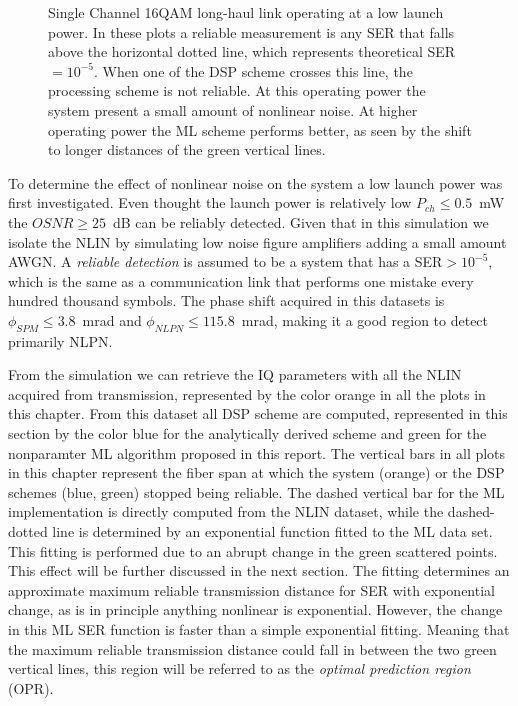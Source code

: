 \begin{figure}[h]
  \centering
  \qquad
     \qquad
    \caption{Single Channel 16QAM long-haul link operating at a low launch power. In these plots a reliable measurement is any SER that falls above the horizontal dotted line, which represents theoretical SER$=10^{-5}$. When one of the DSP scheme crosses this line, the processing scheme is not reliable. At this operating power the system present a small amount of nonlinear noise. At higher operating power the ML scheme performs better, as seen by the shift to longer distances of the green vertical lines.  }
    \label{fig:lowP}
\end{figure}
 
To determine the effect of nonlinear noise on the system a low launch power was first investigated. Even thought the launch power is relatively low $P_{ch}\le 0.5$~mW the $OSNR\ge 25$~dB can be reliably detected. Given that in this simulation we isolate the NLIN by simulating low noise figure amplifiers adding a small amount AWGN. A \textit{reliable detection} is assumed to be a system that has a SER$>10^{-5}$, which is the same as a communication link that performs one mistake every hundred thousand symbols. The phase shift acquired in this datasets is $\phi_{SPM}\le 3.8$~mrad and $\phi_{NLPN}\le 115.8$~mrad, making it a good region to detect primarily NLPN. 


 From the simulation we can retrieve the IQ parameters  with all the NLIN acquired from transmission, represented by the color orange in all the plots in this chapter. From this dataset all DSP scheme are computed, represented in this section by the color blue for the analytically derived scheme and green for the nonparamter ML algorithm proposed in this report. The vertical bars in all plots in this chapter represent the fiber span at which the system (orange) or the DSP schemes (blue, green) stopped being reliable. The dashed vertical bar for the ML implementation is directly computed from the NLIN dataset, while the dashed-dotted line is determined by an exponential function fitted to the ML data set. This fitting is performed due to an abrupt change in the green scattered points. This effect will be further discussed in the next section. The fitting determines an approximate maximum reliable transmission distance for SER with exponential change, as is in principle anything nonlinear is exponential. However, the change in this ML SER function is faster than a simple exponential fitting. Meaning that the maximum reliable transmission distance could fall in between the two green vertical lines, this region will be referred to as the \textit{optimal prediction region} (OPR). 
 
